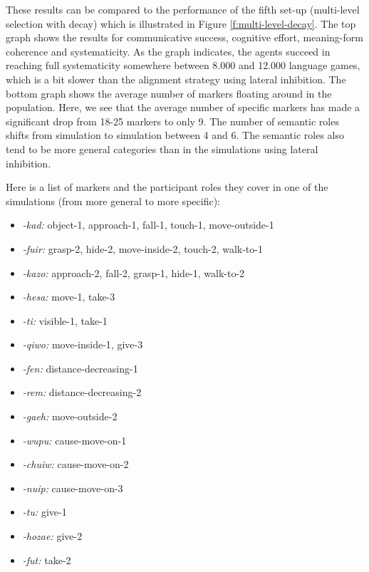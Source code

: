These results can be compared to the performance of the fifth set-up (multi-level selection with decay) which is illustrated in Figure \ref{f:multi-level-decay}. The top graph shows the results for communicative success, cognitive effort, meaning-form coherence and systematicity. As the graph indicates, the agents succeed in reaching full systematicity somewhere between 8.000 and 12.000 language games, which is a bit slower than the alignment strategy using lateral inhibition. The bottom graph shows the average number of markers floating around in the population. Here, we see that the average number of specific markers has made a significant drop from 18-25 markers to only 9. The number of semantic roles shifts from simulation to simulation between 4 and 6. The semantic roles also tend to be more general categories than in the simulations using lateral inhibition.


Here is a list of markers and the participant roles they cover in one of the simulations (from more general to more specific):

\begin{itemize}
\item {\em -kad:} object-1, approach-1, fall-1, touch-1, move-outside-1
\item {\em -fuir:}  grasp-2, hide-2, move-inside-2, touch-2, walk-to-1
\item {\em -kazo:} approach-2, fall-2, grasp-1, hide-1, walk-to-2
\item {\em -hesa:} move-1, take-3
\item {\em -ti:} visible-1, take-1
\item {\em -qiwo:} move-inside-1, give-3
\item {\em -fen:} distance-decreasing-1
\item {\em -rem:} distance-decreasing-2
\item {\em -gaeh:} move-outside-2
\item {\em -wupu:} cause-move-on-1
\item {\em -chuiw:} cause-move-on-2
\item {\em -nuip:} cause-move-on-3
\item {\em -tu:} give-1
\item {\em -hozae:} give-2
\item {\em -fut:} take-2
\end{itemize}

